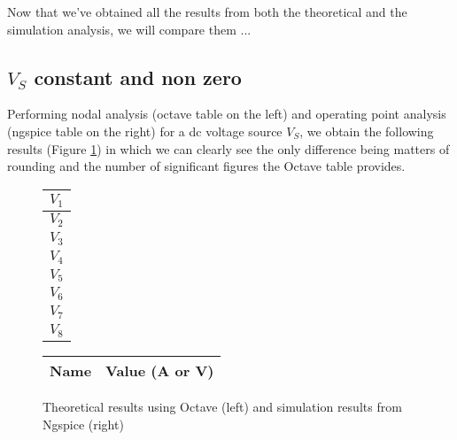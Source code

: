\label{Conclusion}
\hspace{12pt} Now that we've obtained all the results from both the theoretical and the simulation analysis, we will compare them ...
\subsection{$V_S$ constant and non zero}
\hspace{12pt} Performing nodal analysis (octave table on the left) and operating point analysis (ngspice table on the right) for a dc voltage source $V_S$, we obtain the following results (Figure \ref{comp1}) in which we can clearly see the only difference being matters of rounding and the number of significant figures the Octave table provides.

\begin{figure}[h]
	\begin{minipage}{.3\textwidth}
		\flushright
		\begin{tabular}{|c|}
		    \hline
		    $V_1$ \\
		    \hline
		    $V_2$ \\
		    \hline
		    $V_3$ \\
		    \hline
		    $V_4$ \\
		    \hline
		    $V_5$ \\
		    \hline
		    $V_6$ \\
		    \hline
		    $V_7$ \\
		    \hline
		    $V_8$ \\
		    \hline
		\end{tabular}
	\end{minipage}	
	\hspace{-8pt}
	\begin{minipage}{.3\textwidth}
		\flushleft
		
	\end{minipage}
	\hspace{10pt}
	\begin{minipage}{.3\textwidth}
		\begin{tabular}{|c|c|}
			\hline
			\textbf{Name} & \textbf{Value (A or V)} \\
			\hline
			
		\end{tabular}
	\end{minipage}
	\caption{Theoretical results using Octave (left) and simulation results from Ngspice (right)}    
	\label{comp1}
\end{figure}
\pagebreak
